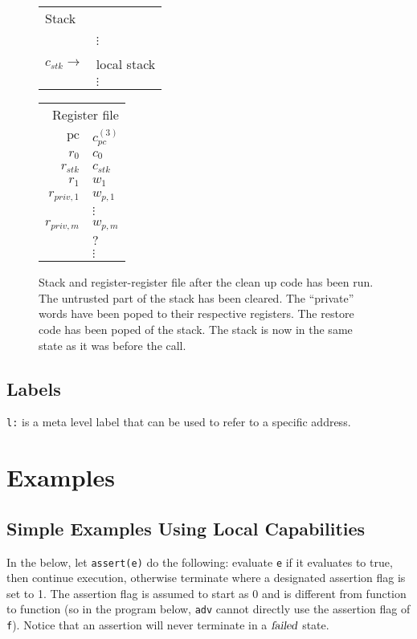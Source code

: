 \documentclass[a4paper]{article}
\newcommand{\var}[1]{\mathit{#1}}
\newcommand{\pc}{\mathit{pc}}
\newcommand{\pcreg}{\mathrm{pc}}
\newcommand{\failed}{\textsl{failed}}
\begin{document}
\begin{figure}
  \label{fig:stack-after-restore-code}
  \centering
  \begin{tabular}[!h]{r | >{\raggedright\arraybackslash}p{3cm} |}
\multicolumn{2}{l}{Stack} \\
\cline{2-2}
   & \\
   & $\vdots$\\
\cline{2-2}
   & 0 \\
\cline{2-2}
$c_{\var{stk}} \rightarrow$   & local stack\\
   & $\vdots$\\
\cline{2-2}
\end{tabular}
\hspace{1cm}
\begin{tabular}{r | >{\centering\arraybackslash}p{0.75cm} |}
\multicolumn{2}{r}{Register file} \\
\cline{2-2}
$\pcreg$ & $c_\pc^{(3)}$\\
\cline{2-2}
$r_0$  &  $c_0$ \\
\cline{2-2}
$r_{\var{stk}}$  & $c_{\var{stk}}$ \\
\cline{2-2}
$r_1$ & $w_1$ \\
\cline{2-2}
$r_{\var{priv},1}$ & $w_{p,1}$\\
\cline{2-2}
& $\vdots$ \\
\cline{2-2}
$r_{\var{priv},m}$ & $w_{p,m}$ \\
\cline{2-2}
& $?$ \\
\cline{2-2}
& $\vdots$ \\
\cline{2-2}
\end{tabular}
\caption{ Stack and register-register file after the clean up code has been run. The untrusted part of the stack has been cleared. The ``private'' words have been poped to their respective registers. The restore code has been poped of the stack. The stack is now in the same state as it was before the call. }
\end{figure}


\subsection{Labels}
\texttt{l:} is a meta level label that can be used to refer to a specific address.

\section{Examples}
\label{sec:examples}
\subsection{Simple Examples Using Local Capabilities}
\label{subsec:example-loc-cap}
In the below, let \texttt{assert(e)} do the following: evaluate \texttt{e} if it evaluates to true, then continue execution, otherwise terminate where a designated assertion flag is set to 1. The assertion flag is assumed to start as 0 and is different from function to function (so in the program below, \texttt{adv} cannot directly use the assertion flag of \texttt{f}). Notice that an assertion will never terminate in a $\failed$ state.
\end{document}
